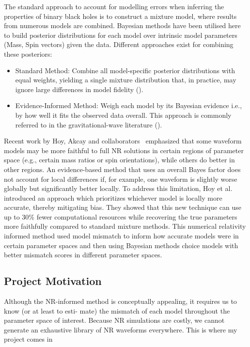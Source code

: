 \documentclass[12pt]{article}
\begin{document}
The standard approach to account for modelling errors when inferring the properties of binary black holes is to construct a mixture model, where results from numerous models are combined.
Bayesian methods have been utilised here to build posterior distributions for each model over intrinsic model parameters (Mass, Spin vectors) given the data. Different approaches exist for combining these posteriors:
\begin{itemize}
    \item Standard Method: Combine all model-specific posterior distributions with equal weights, yielding a single mixture distribution that, in practice, may ignore large differences in model fidelity (\cite{linearcombination}).
    \item Evidence-Informed Method: Weigh each model by its Bayesian evidence i.e., by how well it fits the observed data overall. This approach is commonly referred to in the gravitational-wave literature (\cite{Bayesianapproach}).
\end{itemize}

Recent work by Hoy, Akcay and collaborators~\cite{Ogpaper} emphasized that some waveform models may be more faithful to full NR solutions in certain regions of parameter space (e.g., certain mass ratios or spin orientations),
while others do better in other regions. An evidence-based method that uses an overall Bayes factor does not account for local differences if, for example, one waveform is slightly worse globally but significantly better locally.
To address this limitation, Hoy et al.\cite{Ogpaper} introduced an approach which prioritizes whichever model is locally more accurate, thereby mitigating bias.
They showed that this new technique can use up to 30\% fewer computational resources while recovering the true parameters more faithfully compared to standard mixture methods.
This numerical relativity informed method used model mismatch to inform how accurate models were in certain parameter spaces and then using Bayesian methods choice models with better 
mismatch scores in different parameter spaces.


\subsection{Project Motivation}
Although the NR-informed method is conceptually appealing, it requires us to know (or at least to esti-
mate) the mismatch of each model throughout the parameter space of interest. Because
NR simulations are costly, we cannot generate an exhaustive library of NR waveforms
everywhere. This is where my project comes in
\end{document}
